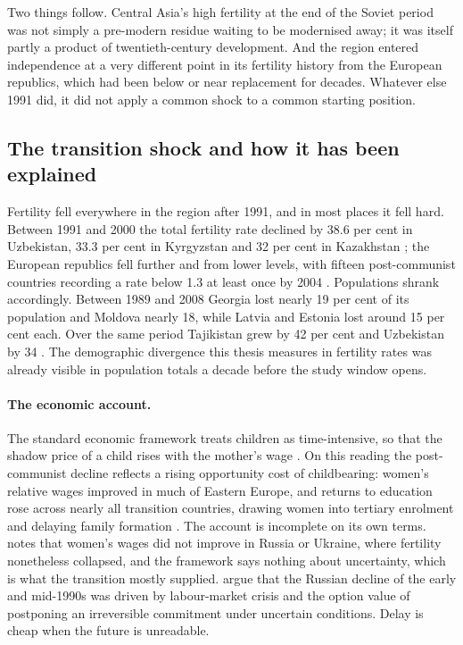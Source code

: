 Two things follow. Central Asia's high fertility at the end of the Soviet period was not simply a pre-modern residue waiting to be modernised away; it was itself partly a product of twentieth-century development. And the region entered independence at a very different point in its fertility history from the European republics, which had been below or near replacement for decades. Whatever else 1991 did, it did not apply a common shock to a common starting position.

\subsection{The transition shock and how it has been explained}
\label{sec:transition}

Fertility fell everywhere in the region after 1991, and in most places it fell hard. Between 1991 and 2000 the total fertility rate declined by 38.6 per cent in Uzbekistan, 33.3 per cent in Kyrgyzstan and 32 per cent in Kazakhstan \parencite{spoorenberg2013}; the European republics fell further and from lower levels, with fifteen post-communist countries recording a rate below 1.3 at least once by 2004 \parencite{billingsley2010}. Populations shrank accordingly. Between 1989 and 2008 Georgia lost nearly 19 per cent of its population and Moldova nearly 18, while Latvia and Estonia lost around 15 per cent each. Over the same period Tajikistan grew by 42 per cent and Uzbekistan by 34 \parencite{brainerd2010}. The demographic divergence this thesis measures in fertility rates was already visible in population totals a decade before the study window opens.

\paragraph{The economic account.} The standard economic framework treats children as time-intensive, so that the shadow price of a child rises with the mother's wage \parencite{becker1981}. On this reading the post-communist decline reflects a rising opportunity cost of childbearing: women's relative wages improved in much of Eastern Europe, and returns to education rose across nearly all transition countries, drawing women into tertiary enrolment and delaying family formation \parencite{brainerd2010}. The account is incomplete on its own terms. \textcite{brainerd2010} notes that women's wages did not improve in Russia or Ukraine, where fertility nonetheless collapsed, and the framework says nothing about uncertainty, which is what the transition mostly supplied. \textcite{kohler2002} argue that the Russian decline of the early and mid-1990s was driven by labour-market crisis and the option value of postponing an irreversible commitment under uncertain conditions. Delay is cheap when the future is unreadable.

